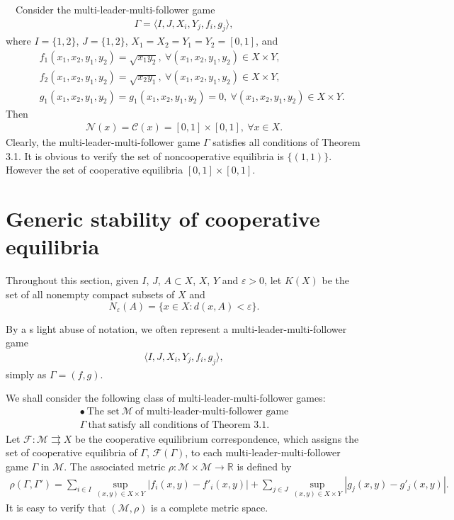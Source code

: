 ~~Consider the multi-leader-multi-follower game
\begin{eqnarray*}
\Gamma=\langle I,J,X_i,Y_j,f_i,g_j\rangle,
\end{eqnarray*}
where $I=\{1,2\}$, $J=\{1,2\}$, $X_1=X_2=Y_1=Y_2=[0,1]$,
and
\begin{eqnarray*}
&&f_1(x_1,x_2,y_1,y_2)=\sqrt{x_1y_2},\ \forall  (x_1,x_2,y_1,y_2)\in X\times Y,\\
&&f_2(x_1,x_2,y_1,y_2)=\sqrt{x_2y_1},\ \forall  (x_1,x_2,y_1,y_2)\in X\times Y,\\
&&g_1(x_1,x_2,y_1,y_2)=g_1(x_1,x_2,y_1,y_2)=0,\ \forall  (x_1,x_2,y_1,y_2)\in X\times Y.
\end{eqnarray*}
Then
\begin{eqnarray*}
\mathcal{N}(x)=\mathcal{C}(x)=[0,1]\times [0,1],\ \forall x\in X.
\end{eqnarray*}
Clearly, the multi-leader-multi-follower game $\Gamma$
satisfies all conditions of Theorem 3.1.
It is obvious to verify the set of noncooperative equilibria is $\{(1,1)\}$. However
the set of cooperative equilibria $[0,1]\times [0,1]$.





\section{Generic stability of cooperative equilibria}

Throughout this section,
given $I$, $J$, $A\subset X$, $X$, $Y$ and $\varepsilon>0$, let $K(X)$ be the set of
all nonempty compact subsets of $X$ and $$N_\varepsilon(A)=\{x\in X:d(x,A)<\varepsilon\}.$$

By a s light abuse of notation, we often represent a multi-leader-multi-follower game
\begin{eqnarray*}
\langle I,J,X_i,Y_j,f_i,g_j\rangle,
\end{eqnarray*}
simply as $\Gamma=(f,g)$.

We shall consider the following class of multi-leader-multi-follower games:
\begin{eqnarray*}
\bullet\ \mbox{The\ set}\ \mathcal{M}\ \mbox{of\ multi-leader-multi-follower game}\\
\Gamma\ \mbox{that}\ \mbox{satisfy\ all\ conditions\ of\ Theorem 3.1}.
\end{eqnarray*}
Let $\mathcal{F} :\mathcal{M}\rightrightarrows X$ be
the cooperative equilibrium correspondence, which assigns the set of
cooperative equilibria of $\Gamma$,
$\mathcal{F}(\Gamma)$, to each multi-leader-multi-follower game $\Gamma
$ in $\mathcal{M}$. The associated
metric $\rho:\mathcal{M}\times \mathcal{M}\longrightarrow\mathbb{R}$ is
defined by
\begin{eqnarray*}
\rho(\Gamma,\Gamma')=\sum_{i\in I}\sup_{(x,y)\in X\times Y}|f_i(x,y)-f'_i(x,y)|+\sum_{j\in J}\sup_{(x,y)\in X\times Y}|g_j(x,y)-g'_j(x,y)|.
\end{eqnarray*}
It is easy to verify that $(\mathcal{M},\rho)$ is a complete metric
space.

